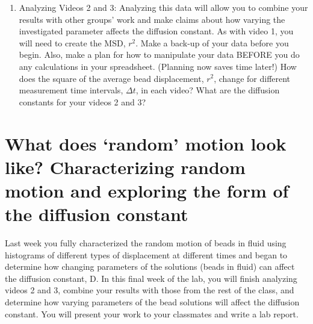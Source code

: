 \begin{enumerate}
\item Analyzing Videos 2 and 3: Analyzing this data will allow you to combine your results with other groups' work and make claims about how varying the investigated parameter affects the diffusion constant. As with video 1, you will need to create the MSD, $r^{2}$. Make a back-up of your data before you begin. Also, make a plan for how to manipulate your data BEFORE you do any calculations in your spreadsheet. (Planning now saves time later!) How does the square of the average bead displacement, $r^{2}$, change for different measurement time intervals, $\Delta t$, in each video? What are the diffusion constants for your videos 2 and 3?
\end{enumerate}
%
\section{What does `random' motion look like? Characterizing random motion and exploring the form of the diffusion constant}
Last week you fully characterized the random motion of beads in fluid using histograms of different types of displacement at different times and began to determine how changing parameters of the solutions (beads in fluid) can affect the diffusion constant, D. In this final week of the lab, you will finish analyzing videos 2 and 3, combine your results with those from the rest of the class, and determine how varying parameters of the bead solutions will affect the diffusion constant. You will present your work to your classmates and write a lab report.
